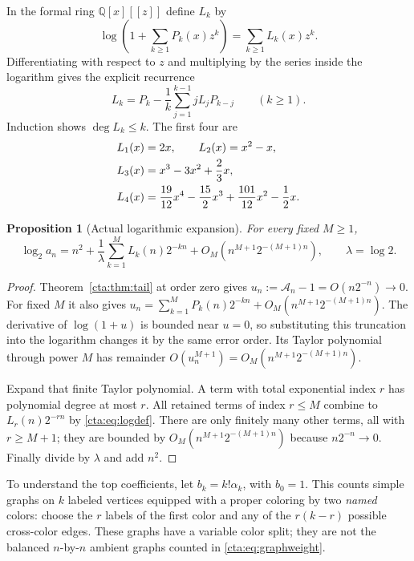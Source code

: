 \documentclass[11pt]{article}
\newtheorem{proposition}[theorem]{Proposition}
\theoremstyle{definition}
\theoremstyle{remark}
\newcommand{\la}{\lambda}
\newcommand{\As}{\mathcal A}
\begin{document}
In the formal ring $\mathbb Q[x][[z]]$ define $L_k$ by
\begin{equation}\label{cta:eq:logdef}
 \log\!\left(1+\sum_{k\geq1}P_k(x)z^k\right)
       =\sum_{k\geq1}L_k(x)z^k.
\end{equation}
Differentiating with respect to $z$ and multiplying by the series inside
the logarithm gives the explicit recurrence
\begin{equation}\label{cta:eq:Lrec}
 L_k=P_k-\frac1k\sum_{j=1}^{k-1}jL_jP_{k-j}\qquad(k\geq1).
\end{equation}
Induction shows $\deg L_k\leq k$. The first four are
\begin{align}\label{cta:eq:firstL}
 L_1(x)&=2x,\qquad L_2(x)=x^2-x,\notag\\
 L_3(x)&=x^3-3x^2+\frac23x,\notag\\
 L_4(x)&=\frac{19}{12}x^4-\frac{15}{2}x^3+\frac{101}{12}x^2-\frac12x.
\end{align}

\begin{proposition}[Actual logarithmic expansion]\label{cta:prop:log}
For every fixed $M\geq1$,
\begin{equation}\label{cta:eq:logasympt}
 \log_2 a_n=n^2+\frac1\la\sum_{k=1}^M L_k(n)2^{-kn}
            +O_M(n^{M+1}2^{-(M+1)n}),\qquad \la=\log2.
\end{equation}
\end{proposition}
\begin{proof}
Theorem~\ref{cta:thm:tail} at order zero gives
$u_n:=\As_n-1=O(n2^{-n})\to0$. For fixed $M$ it also gives
$u_n=\sum_{k=1}^MP_k(n)2^{-kn}+O_M(n^{M+1}2^{-(M+1)n})$.
The derivative of $\log(1+u)$ is bounded near $u=0$, so substituting this
truncation into the logarithm changes it by the same error order.
Its Taylor polynomial through power $M$ has remainder
$O(u_n^{M+1})=O_M(n^{M+1}2^{-(M+1)n})$.

Expand that finite Taylor polynomial. A term with total exponential index
$r$ has polynomial degree at most $r$. All retained terms of index
$r\leq M$ combine to $L_r(n)2^{-rn}$ by \eqref{cta:eq:logdef}.
There are only finitely many other terms, all with $r\geq M+1$;
they are bounded by $O_M(n^{M+1}2^{-(M+1)n})$ because $n2^{-n}\to0$.
Finally divide by $\la$ and add $n^2$.
\end{proof}

To understand the top coefficients, let $b_k=k!\alpha_k$, with $b_0=1$.
This counts simple graphs on $k$ labeled vertices equipped with a proper
coloring by two \emph{named} colors: choose the $r$ labels of the first
color and any of the $r(k-r)$ possible cross-color edges. These graphs
have a variable color split; they are not the balanced $n$-by-$n$ ambient
graphs counted in \eqref{cta:eq:graphweight}.
\end{document}
